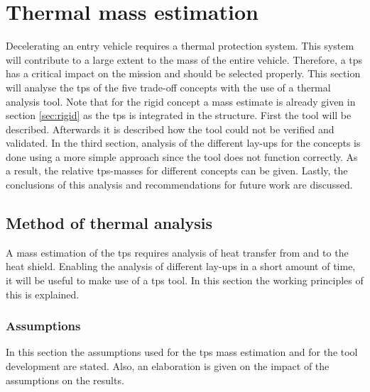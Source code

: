 \section{Thermal mass estimation}
\label{ch:thermtool}
Decelerating an entry vehicle requires a thermal protection system. This system will contribute to a large extent to the mass of the entire vehicle. Therefore, a \acrfull{tps} has a critical impact on the mission and should be selected properly. This section will analyse the \gls{tps} of the five trade-off concepts with the use of a thermal analysis tool. Note that for the rigid concept a mass estimate is already given in section \ref{sec:rigid} as the \gls{tps} is integrated in the structure. First the tool will be described. Afterwards it is described how the tool could not be verified and validated. In the third section, analysis of the different lay-ups for the concepts is done using a more simple approach since the tool does not function correctly. As a result, the relative \gls{tps}-masses for different concepts can be given. Lastly, the conclusions of this analysis and recommendations for future work are discussed.

\subsection{Method of thermal analysis}
A mass estimation of the \gls{tps} requires analysis of heat transfer from and to the heat shield. Enabling the analysis of different lay-ups in a short amount of time, it will be useful to make use of a \gls{tps} tool. In this section the working principles of this is explained.

\subsubsection{Assumptions}
In this section the assumptions used for the \gls{tps} mass estimation and for the tool development are stated. Also, an elaboration is given on the impact of the assumptions on the results.

